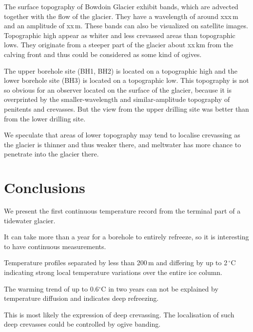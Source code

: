 \documentclass[utf8]{article}
\begin{document}
    The surface topography of Bowdoin Glacier exhibit bands, which are advected
    together with the flow of the glacier. They have a wavelength of around
    xxx\,m and an amplitude of xx\,m. These bands can also be visualized on
    satellite images. Topographic high appear as whiter and less crevassed
    areas than topographic lows. They originate from a steeper part of the
    glacier about xx\,km from the calving front and thus could be considered as
    some kind of ogives.

    The upper borehole site (BH1, BH2) is located on a topographic high and the
    lower borehole site (BH3) is located on a topographic low. This topography
    is not so obvious for an observer located on the surface of the glacier,
    because it is overprinted by the smaller-wavelength and similar-amplitude
    topography of penitents and crevasses. But the view from the upper drilling
    site was better than from the lower drilling site.

    We speculate that areas of lower topography may tend to localise crevassing
    as the glacier is thinner and thus weaker there, and meltwater has more
    chance to penetrate into the glacier there.

\section{Conclusions}

    We present the first continuous temperature record from the terminal part
    of a tidewater glacier.

    It can take more than a year for a borehole to entirely refreeze, so it is
    interesting to have continuous measurements.

    Temperature profiles separated by less than 200\,m and differing by up to
    2\,$^\circ$C indicating strong local temperature variations over the
    entire ice column.

    The warming trend of up to 0.6$^\circ$C in two years can not be explained
    by temperature diffusion and indicates deep refreezing.

    This is most likely the expression of deep crevassing. The localisation of
    such deep crevasses could be controlled by ogive banding.


\clearpage
\end{document}
